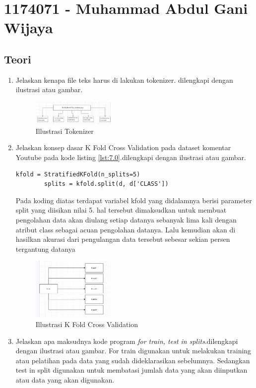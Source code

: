 \section{1174071 - Muhammad Abdul Gani Wijaya}
\subsection{Teori}
\begin{enumerate}
	\item Jelaskan kenapa file teks harus di lakukan tokenizer. dilengkapi dengan ilustrasi atau gambar. 
	\hfill \break
	\begin{figure}[H]
		\includegraphics[width=4cm]{figures/1174071/7/1.png}
		\centering
		\caption{Illustrasi Tokenizer}
	\end{figure}
	\item Jelaskan konsep dasar K Fold Cross Validation pada dataset komentar Youtube pada kode listing \ref{lst:7.0}.dilengkapi dengan ilustrasi atau gambar.
	\hfill \break
	\begin{lstlisting}[caption=K Fold Cross Validation,label={lst:7.0}]
		kfold = StratifiedKFold(n_splits=5)
		splits = kfold.split(d, d['CLASS'])
	\end{lstlisting}
	Pada koding diatas terdapat variabel kfold yang didalamnya berisi parameter split yang diisikan nilai 5. hal tersebut dimaksudkan untuk membuat pengolahan data akan diulang setiap datanya sebanyak lima kali dengan atribut class sebagai acuan pengolahan datanya. Lalu kemudian akan di hasilkan akurasi dari pengulangan data tersebut sebesar sekian persen tergantung datanya
	\begin{figure}[H]
    	\includegraphics[width=4cm]{figures/1174071/7/2.png}
    	\centering
    	\caption{Illustrasi K Fold Cross Validation}
	\end{figure}
	\item Jelaskan apa maksudnya kode program \emph{for train, test in splits}.dilengkapi dengan ilustrasi atau gambar.
	\hfill \break
	For train digunakan untuk melakukan training atau pelatihan pada data yang sudah dideklarasikan sebelumnya. Sedangkan test in split digunakan untuk membatasi jumlah data yang akan diinputkan atau data yang akan digunakan.

\end{enumerate}
